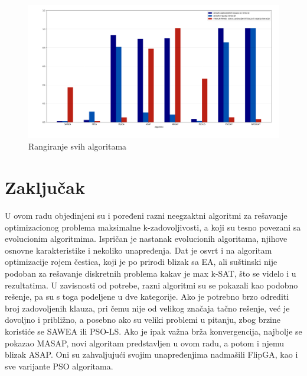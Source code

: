 \documentclass[a4paper]{article}
\begin{document}
\begin{figure}[h!]
\centering
\includegraphics[width=\textwidth]{poredjenje.png}
\caption{Rangiranje svih algoritama}\label{img:poredjenje}
\end{figure}

\newpage

\section{Zaključak}
\label{sec:zakljucak}
U ovom radu objedinjeni su i poređeni razni neegzaktni algoritmi za rešavanje 
optimizacionog problema maksimalne k-zadovoljivosti, 
a koji su tesno povezani sa evolucionim algoritmima. Ispričan je nastanak 
evolucionih algoritama, njihove osnovne karakteristike i nekoliko unapređenja. 
Dat je osvrt i na algoritam optimizacije rojem čestica, koji je po prirodi blizak sa EA,
ali suštinski nije podoban za rešavanje diskretnih problema kakav je max k-SAT, 
što se videlo i u rezultatima. U zavisnosti od potrebe, razni algoritmi su se pokazali
kao podobno rešenje, pa su s toga podeljene u dve kategorije.
Ako je potrebno brzo odrediti broj zadovoljenih klauza,
pri čemu nije od velikog značaja tačno rešenje, već je dovoljno i približno,
a posebno ako su veliki problemi u pitanju, zbog brzine koristiće se SAWEA ili PSO-LS.
Ako je ipak važna brža konvergencija, najbolje se pokazao MASAP, novi algoritam 
predstavljen u ovom radu, a potom i njemu blizak ASAP. 
Oni su zahvaljujući svojim unapređenjima nadmašili FlipGA, 
kao i sve varijante PSO algoritama.



\appendix
 

\end{document}
